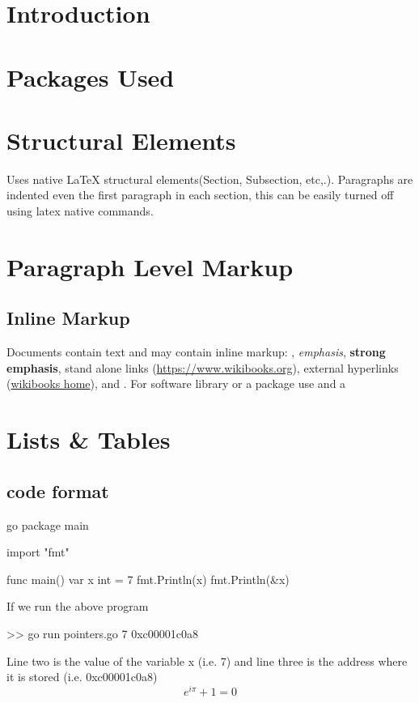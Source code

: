 \documentclass[12pt,a4paper]{report}
\begin{document}
%
\tableofcontents

\section{Introduction}
\section{Packages Used}
\section{Structural Elements}
Uses native LaTeX structural elements(Section, Subsection, etc,.). Paragraphs are indented even the first paragraph in each section, this can be easily turned off using latex native commands.
\section{Paragraph Level Markup}
\subsection{Inline Markup}
Documents contain text and may contain inline markup: , \emph{emphasis}, \textbf{strong emphasis}, stand alone links (\url{https://www.wikibooks.org}), external hyperlinks (\href{https://www.wikibooks.org}{wikibooks home}), and . For software library or a package use  and a 
\section{Lists \& Tables}

\lipsum[1]



\subsection{code format}

%
\begin{code}{go}
package main

import "fmt"

func main() {
  var x int = 7
  fmt.Println(x)
  fmt.Println(&x)
}
\end{code}
%
If we run the above program
\begin{literal}
>> go run pointers.go
7
0xc00001c0a8
\end{literal}
%
Line two is the value of the variable x (i.e. 7) and line three is the address where it is stored (i.e. 0xc00001c0a8)
\begin{equation}
  e^{i\pi}+1=0
  \label{eqn:euler}
\end{equation}
\end{document}
